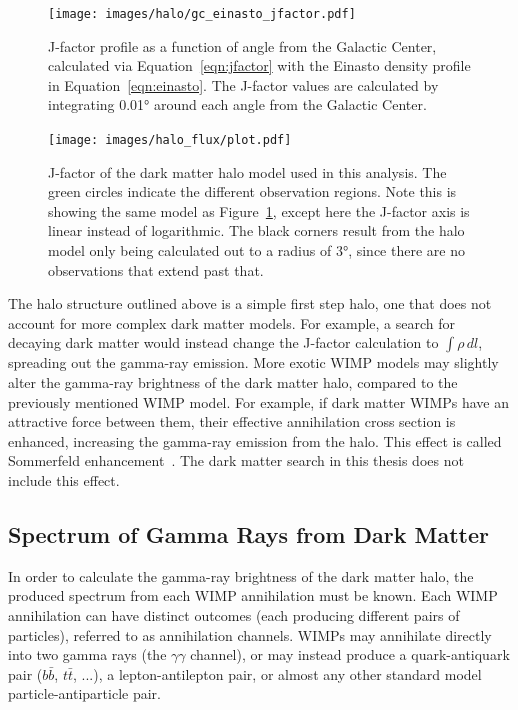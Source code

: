     \begin{figure}[ht]
    \centering
      \texttt{[image: images/halo/gc\_einasto\_jfactor.pdf]}
      \caption[Galactic Center Einasto Halo Jfactor]{
        J-factor profile as a function of angle from the Galactic Center, calculated via Equation~\ref{eqn:jfactor} with the Einasto density profile in Equation~\ref{eqn:einasto}.
        The J-factor values are calculated by integrating \ang{0.01} around each angle from the Galactic Center.
      }
      \label{fig:gchalo_jfactor}
    \end{figure}
  
  \begin{figure}[ht]
    \centering
    \texttt{[image: images/halo\_flux/plot.pdf]}
    \caption[Galactic Center Halo J-factor Skymap]{
      J-factor of the dark matter halo model used in this analysis.
      The green circles indicate the different observation regions.
      Note this is showing the same model as Figure~\ref{fig:gchalo_jfactor}, except here the J-factor axis is linear instead of logarithmic.
      The black corners result from the halo model only being calculated out to a radius of \ang{3}, since there are no observations that extend past that.
    }
    \label{fig:halojfactor}
  \end{figure}

  The halo structure outlined above is a simple first step halo, one that does not account for more complex dark matter models.
  For example, a search for decaying dark matter would instead change the J-factor calculation to $\int \rho \, dl$, spreading out the gamma-ray emission.
  More exotic WIMP models may slightly alter the gamma-ray brightness of the dark matter halo, compared to the previously mentioned WIMP model.
  For example, if dark matter WIMPs have an attractive force between them, their effective annihilation cross section is enhanced, increasing the gamma-ray emission from the halo.
  This effect is called Sommerfeld enhancement~\cite{sommerfeld}.
  The dark matter search in this thesis does not include this effect.
    
  
  \FloatBarrier
  
    
  \subsection{Spectrum of Gamma Rays from Dark Matter}\label{dm_spectral}
    In order to calculate the gamma-ray brightness of the dark matter halo, the produced spectrum from each WIMP annihilation must be known.
    Each WIMP annihilation can have distinct outcomes (each producing different pairs of particles), referred to as annihilation channels.
    WIMPs may annihilate directly into two gamma rays (the $\gamma\gamma$ channel), or may instead produce a quark-antiquark pair ($b\bar{b}$, $t\bar{t}$, ...), a lepton-antilepton pair, or almost any other standard model particle-antiparticle pair.

